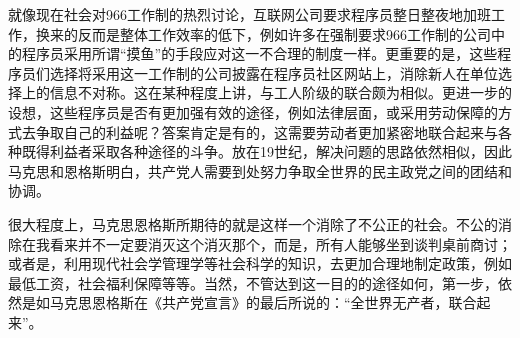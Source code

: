 \documentclass[a4paper,11pt]{ctexart}
\begin{document}
就像现在社会对966工作制的热烈讨论，互联网公司要求程序员整日整夜地加班工作，换来的反而是整体工作效率的低下，例如许多在强制要求966工作制的公司中的程序员采用所谓“摸鱼”的手段应对这一不合理的制度一样。更重要的是，这些程序员们选择将采用这一工作制的公司披露在程序员社区网站上，消除新人在单位选择上的信息不对称。这在某种程度上讲，与工人阶级的联合颇为相似。更进一步的设想，这些程序员是否有更加强有效的途径，例如法律层面，或采用劳动保障的方式去争取自己的利益呢？答案肯定是有的，这需要劳动者更加紧密地联合起来与各种既得利益者采取各种途径的斗争。放在19世纪，解决问题的思路依然相似，因此马克思和恩格斯明白，共产党人需要到处努力争取全世界的民主政党之间的团结和协调。\par
很大程度上，马克思恩格斯所期待的就是这样一个消除了不公正的社会。不公的消除在我看来并不一定要消灭这个消灭那个，而是，所有人能够坐到谈判桌前商讨；或者是，利用现代社会学管理学等社会科学的知识，去更加合理地制定政策，例如最低工资，社会福利保障等等。当然，不管达到这一目的的途径如何，第一步，依然是如马克思恩格斯在《共产党宣言》的最后所说的：“全世界无产者，联合起来”。
\end{document}

